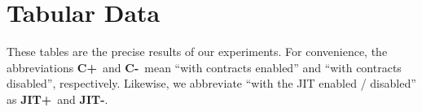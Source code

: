 \section{Tabular Data}

\newcommand{\yesC}{\textbf{C+}}
\newcommand{\noC}{\textbf{C-}}
\newcommand{\yesJIT}{\textbf{JIT+}}
\newcommand{\noJIT}{\textbf{JIT-}}

These tables are the precise results of our experiments.
For convenience, the abbreviations \yesC~and \noC~mean ``with contracts enabled'' and ``with contracts disabled'', respectively.
Likewise, we abbreviate ``with the JIT enabled / disabled'' as \yesJIT~and \noJIT.


\newpage

\newpage

\newpage

\newpage

\newpage

\newpage

\newpage

\newpage

\newpage

\newpage
